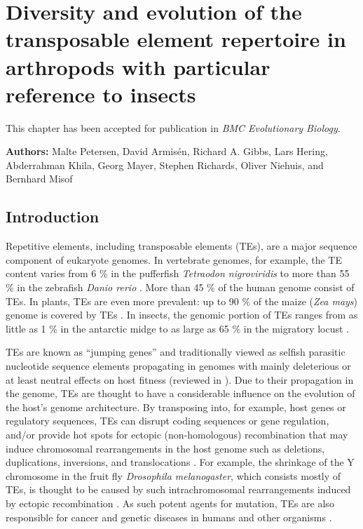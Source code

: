 
\chapter{Diversity and evolution of the transposable element repertoire
in arthropods with particular reference to insects} \label{cha:mobilome}

\newpage

This chapter has been accepted for publication in \emph{BMC Evolutionary
Biology}.

\noindent \textbf{Authors:} Malte Petersen, David Armisén, Richard A. Gibbs, Lars Hering,
Abderrahman Khila, Georg Mayer, Stephen Richards, Oliver Niehuis, and
Bernhard Misof

\section{Introduction}

Repetitive elements, including transposable elements (TEs), are a major
sequence component of eukaryote genomes. In vertebrate genomes, for
example, the TE content varies from 6 \% in the pufferfish
\emph{Tetraodon nigroviridis} to more than 55 \% in the zebrafish
\emph{Danio rerio} \citep{Chalopin2015}. More than 45 \% of the human
genome \citep{deKoning2011} consist of TEs. In plants, TEs are even more
prevalent: up to 90 \% of the maize (\emph{Zea mays}) genome is covered
by TEs \citep{SanMiguel1996}. In insects, the genomic portion of TEs ranges
from as little as 1 \% in the antarctic midge \citep{Kelley2014} to as
large as 65 \% in the migratory locust \citep{Wang2014}.

TEs are known as ``jumping genes'' and traditionally viewed as selfish
parasitic nucleotide sequence elements propagating in genomes with
mainly deleterious or at least neutral effects on host fitness
\citep{Mackay1989, Pasyukova2004} (reviewed in \citet{Barron2014}). Due to their
propagation in the genome, TEs are thought to have a considerable
influence on the evolution of the host's genome architecture. By
transposing into, for example, host genes or regulatory sequences, TEs
can disrupt coding sequences or gene regulation, and/or provide hot
spots for ectopic (non-homologous) recombination that may induce
chromosomal rearrangements in the host genome such as deletions,
duplications, inversions, and translocations \citep{Burns2012}. For
example, the shrinkage of the Y chromosome in the fruit fly
\emph{Drosophila melanogaster}, which consists mostly of TEs, is thought
to be caused by such intrachromosomal rearrangements induced by ectopic
recombination \citep{Adams2000, Kent2017}. As such potent agents for mutation,
TEs are also responsible for cancer and genetic diseases in humans and
other organisms \citep{Vorechovsky2009,Chenais2015,Hancks2016}.

